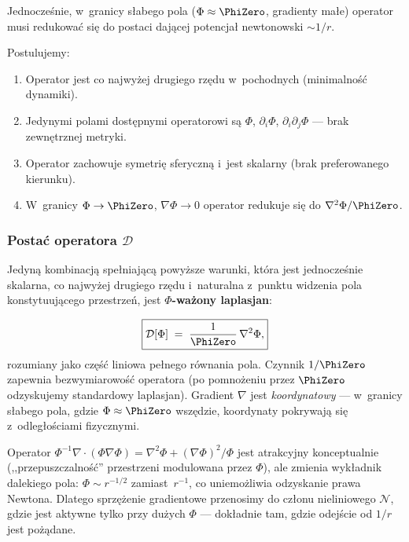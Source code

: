 Jednocze\'snie, w~granicy s\l{}abego pola ($\Phi \approx \PhiZero$,
gradienty ma\l{}e) operator musi redukowa\'c si\k{e} do postaci
daj\k{a}cej potencja\l{} newtonowski $\sim 1/r$.

Postulujemy:
\begin{enumerate}[nosep]
  \item Operator jest co najwy\.zej drugiego rz\k{e}du w~pochodnych
        (minimalno\'s\'c dynamiki).
  \item Jedynymi polami dost\k{e}pnymi operatorowi s\k{a}
        $\Phi$, $\partial_i\Phi$, $\partial_i\partial_j\Phi$
        --- brak zewn\k{e}trznej metryki.
  \item Operator zachowuje symetri\k{e} sferyczn\k{a} i~jest
        skalarny (brak preferowanego kierunku).
  \item W~granicy $\Phi\to\PhiZero$, $\nabla\Phi\to 0$
        operator redukuje si\k{e} do $\nabla^2\Phi/\PhiZero$.
\end{enumerate}

\subsubsection{Posta\'c operatora $\mathcal{D}$}

Jedyn\k{a} kombinacj\k{a} spe\l{}niaj\k{a}c\k{a} powy\.zsze warunki,
kt\'ora jest jednocze\'snie skalarna, co najwy\.zej drugiego rz\k{e}du
i~naturalna z~punktu widzenia pola konstytuuj\k{a}cego przestrze\'n,
jest \textbf{$\Phi$-wa\.zony laplasjan}:

\begin{definition}\label{def:D}
\begin{equation}\label{eq:D-def}
  \boxed{
    \mathcal{D}[\Phi]
    \;=\; \frac{1}{\PhiZero}\,\nabla^2 \Phi,
  }
\end{equation}
rozumiany jako cz\k{e}\'s\'c liniowa pe\l{}nego r\'ownania pola.
Czynnik $1/\PhiZero$ zapewnia bezwymiarowo\'s\'c operatora
(po pomno\.zeniu przez $\PhiZero$ odzyskujemy standardowy
laplasjan). Gradient $\nabla$ jest \emph{koordynatowy} ---
w~granicy s\l{}abego pola, gdzie $\Phi\approx\PhiZero$ wsz\k{e}dzie,
koordynaty pokrywaj\k{a} si\k{e} z~odleg\l{}o\'sciami fizycznymi.
\end{definition}

\begin{remark}
Operator $\Phi^{-1}\nabla\!\cdot\!(\Phi\nabla\Phi)
= \nabla^2\Phi + (\nabla\Phi)^2/\Phi$ jest atrakcyjny
konceptualnie (,,przepuszczalno\'s\'c'' przestrzeni modulowana
przez $\Phi$), ale zmienia wyk\l{}adnik dalekiego pola:
$\Phi\sim r^{-1/2}$ zamiast~$r^{-1}$, co uniemo\.zliwia
odzyskanie prawa Newtona. Dlatego sprz\k{e}\.zenie gradientowe
przenosimy do cz\l{}onu nieliniowego $\mathcal{N}$, gdzie
jest aktywne tylko przy du\.zych $\Phi$ --- dok\l{}adnie tam,
gdzie odej\'scie od $1/r$ jest po\.z\k{a}dane.
\end{remark}


